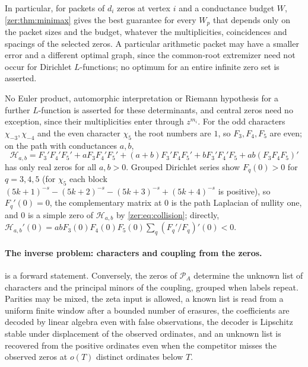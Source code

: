 In particular, for packets of $d_i$ zeros at vertex $i$ and a conductance budget $W$,
\cref{zer:thm:minimax} gives the best guarantee for every $W_p$ that depends only on the packet sizes
and the budget, whatever the multiplicities, coincidences and spacings of the selected zeros. A
particular arithmetic packet may have a smaller error and a different optimal graph, since the
common-root extremizer need not occur for Dirichlet $L$-functions; no optimum for an entire infinite
zero set is asserted.

No Euler product, automorphic interpretation or Riemann hypothesis for a further $L$-function is
asserted for these determinants, and central zeros need no exception, since their multiplicities
enter through $z^{m_i}$. For the odd characters $\chi_{-3},\chi_{-4}$ and the even character
$\chi_5$ the root numbers are $1$, so $F_3,F_4,F_5$ are even; on the path with conductances $a,b$,
\[
 \mathcal H_{a,b}=F_3'F_4'F_5'+aF_3F_4'F_5'+(a+b)F_3'F_4F_5'+bF_3'F_4'F_5+ab(F_3F_4F_5)'
\]
has only real zeros for all $a,b>0$. Grouped Dirichlet series show $F_q(0)>0$ for $q=3,4,5$ (for
$\chi_5$ each block $(5k+1)^{-s}-(5k+2)^{-s}-(5k+3)^{-s}+(5k+4)^{-s}$ is positive), so $F_q'(0)=0$, the
complementary matrix at $0$ is the path Laplacian of nullity one, and $0$ is a simple zero of
$\mathcal H_{a,b}$ by \eqref{zer:eq:collision}; directly,
$\mathcal H_{a,b}'(0)=abF_3(0)F_4(0)F_5(0)\sum_q(F_q'/F_q)'(0)<0$.

\paragraph{The inverse problem: characters and coupling from the zeros.}
 is a forward statement. Conversely, the zeros of $\mathcal P_A$ determine
the unknown list of characters and the principal minors of the coupling, grouped when labels repeat.
Parities may be mixed, the zeta input is allowed, a known list is read from a uniform finite window
after a bounded number of erasures, the coefficients are decoded by linear algebra even with false
observations, the decoder is Lipschitz stable under displacement of the observed ordinates, and an
unknown list is recovered from the positive ordinates even when the competitor misses the observed
zeros at $o(T)$ distinct ordinates below $T$.

